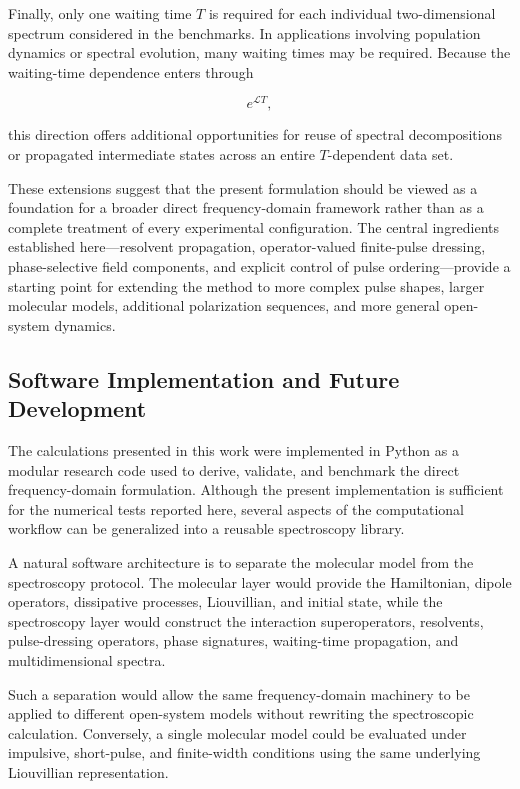 \documentclass[11pt]{article}
\begin{document}
Finally, only one waiting time $T$ is required for each individual
two-dimensional spectrum considered in the benchmarks.  In
applications involving population dynamics or spectral evolution,
many waiting times may be required.  Because the waiting-time
dependence enters through

\begin{equation}
e^{\mathcal{L}T},
\end{equation}

this direction offers additional opportunities for reuse of spectral
decompositions or propagated intermediate states across an entire
$T$-dependent data set.

These extensions suggest that the present formulation should be viewed
as a foundation for a broader direct frequency-domain framework rather
than as a complete treatment of every experimental configuration.
The central ingredients established here---resolvent propagation,
operator-valued finite-pulse dressing, phase-selective field
components, and explicit control of pulse ordering---provide a
starting point for extending the method to more complex pulse shapes,
larger molecular models, additional polarization sequences, and more
general open-system dynamics.

\subsection{Software Implementation and Future Development}
\label{subsec:software_outlook}

The calculations presented in this work were implemented in Python as
a modular research code used to derive, validate, and benchmark the
direct frequency-domain formulation.  Although the present
implementation is sufficient for the numerical tests reported here,
several aspects of the computational workflow can be generalized into
a reusable spectroscopy library.

A natural software architecture is to separate the molecular model
from the spectroscopy protocol.  The molecular layer would provide the
Hamiltonian, dipole operators, dissipative processes, Liouvillian, and
initial state, while the spectroscopy layer would construct the
interaction superoperators, resolvents, pulse-dressing operators,
phase signatures, waiting-time propagation, and multidimensional
spectra.

Such a separation would allow the same frequency-domain machinery to
be applied to different open-system models without rewriting the
spectroscopic calculation.  Conversely, a single molecular model could
be evaluated under impulsive, short-pulse, and finite-width conditions
using the same underlying Liouvillian representation.
\end{document}
